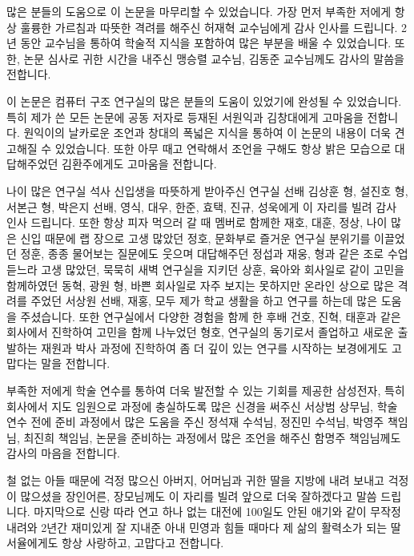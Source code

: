 
\acknowledgement[korean]


많은 분들의 도움으로 이 논문을 마무리할 수 있었습니다. 
가장 먼저 부족한 저에게 항상 훌륭한 가르침과 따뜻한 격려를 해주신 허재혁 교수님에게 감사 인사를 드립니다. 
2년 동안 교수님을 통하여 학술적 지식을 포함하여 많은 부분을 배울 수 있었습니다. 
또한, 논문 심사로 귀한 시간을 내주신 맹승렬 교수님, 김동준 교수님께도 감사의 말씀을 전합니다. 


이 논문은 컴퓨터 구조 연구실의 많은 분들의 도움이 있었기에 완성될 수 있었습니다. 
특히 제가 쓴 모든 논문에 공동 저자로 등재된 서원익과 김창대에게 고마움을 전합니다. 
원익이의 날카로운 조언과 창대의 폭넓은 지식을 통하여 이 논문의 내용이 더욱 견고해질 수 있었습니다. 
또한 아무 때고 연락해서 조언을 구해도 항상 밝은 모습으로 대답해주었던 김환주에게도 고마움을 전합니다. 

나이 많은 연구실 석사 신입생을 따뜻하게 받아주신 연구실 선배 김상훈 형, 설진호 형, 서본근 형, 박은지 선배, 영식, 대우, 한준, 효택, 진규, 성욱에게 이 자리를 빌려 감사 인사 드립니다. 
또한 항상 피자 먹으러 갈 때 멤버로 함께한 재호, 대훈, 정상, 나이 많은 신입 때문에 랩 장으로 고생 많았던 정호,
문화부로 즐거운 연구실 분위기를 이끌었던 정훈, 종종 물어보는 질문에도 웃으며 대답해주던 정섭과 재웅, 
형과 같은 조로 수업 듣느라 고생 많았던, 묵묵히 새벽 연구실을 지키던 상훈, 
육아와 회사일로 같이 고민을 함께하였던 동혁, 광원 형, 바쁜 회사일로 자주 보지는 못하지만 온라인 상으로 많은 격려를 주었던 서상원 선배, 재홍, 모두 제가 학교 생활을 하고 연구를 하는데 많은 도움을 주셨습니다. 
또한 연구실에서 다양한 경험을 함께 한 후배 건호, 진혁, 태훈과 같은 회사에서 진학하여 고민을 함께 나누었던 형호, 
연구실의 동기로서 졸업하고 새로운 출발하는 재원과 박사 과정에 진학하여 좀 더 깊이 있는 연구를 시작하는 보경에게도 고맙다는 말을 전합니다.

부족한 저에게 학술 연수를 통하여 더욱 발전할 수 있는 기회를 제공한 삼성전자, 특히 회사에서 지도 임원으로 과정에 충실하도록 많은 신경을 써주신 서상범 상무님, 학술 연수 전에 준비 과정에서 많은 도움을 주신 정석재 수석님, 
정진민 수석님, 박영주 책임님, 최진희 책임님, 논문을 준비하는 과정에서 많은 조언을 해주신 함명주 책임님께도 감사의 마음을 전합니다. 

철 없는 아들 때문에 걱정 많으신 아버지, 어머님과 귀한 딸을 지방에 내려 보내고 걱정이 많으셨을 장인어른, 장모님께도 이 자리를 빌려 앞으로 더욱 잘하겠다고 말씀 드립니다. 
마지막으로 신랑 따라 연고 하나 없는 대전에 100일도 안된 애기와 같이 무작정 내려와 2년간 재미있게 잘 지내준 아내 민영과 힘들 때마다 제 삶의 활력소가 되는 딸 서율에게도 항상 사랑하고, 고맙다고 전합니다. 
